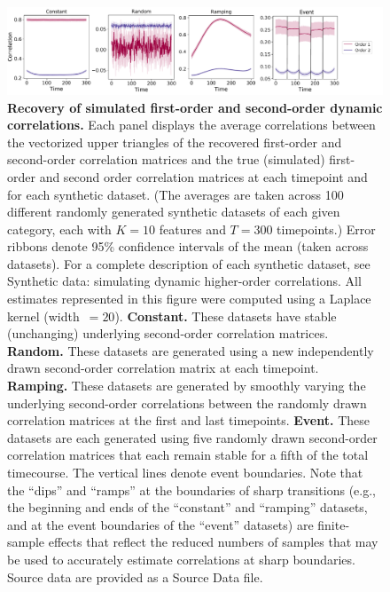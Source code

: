 \documentclass[english]{article}
\begin{document}
\begin{figure}[tp]
  \centering
  \includegraphics[width=\textwidth]{figs/higher_order_sims}
  \caption{\textbf{Recovery of simulated first-order and second-order dynamic correlations.} Each panel displays the average correlations
    between the vectorized upper triangles of the recovered
    first-order and second-order correlation matrices and the true
    (simulated) first-order and second order correlation matrices at each
    timepoint and for each synthetic dataset.  (The averages are taken across 100 different
    randomly generated synthetic datasets of each given category, each
    with $K = 10$ features and $T = 300$ timepoints.)
    Error ribbons denote 95\% confidence intervals of the mean (taken across
    datasets).  For a complete description of each synthetic dataset,
    see Synthetic data: simulating dynamic higher-order
      correlations.  All estimates represented in this figure were
    computed using a Laplace kernel
    (width~$=20$).  \textbf{Constant.} These datasets
    have stable (unchanging) underlying second-order correlation
    matrices. \textbf{Random.} These datasets are
    generated using a new independently drawn second-order correlation
    matrix at each timepoint. \textbf{Ramping.}
    These datasets are generated by smoothly varying the underlying
    second-order correlations between the randomly drawn correlation
    matrices at the first and last timepoints. \textbf{Event.}  These datasets are each generated using five
    randomly drawn second-order correlation matrices that each remain
    stable for a fifth of the total timecourse.  The
    vertical lines denote event boundaries.  Note that the ``dips''
    and ``ramps'' at the boundaries of sharp transitions (e.g., the
    beginning and ends of the ``constant'' and ``ramping'' datasets,
    and at the event boundaries of the ``event'' datasets) are
    finite-sample effects that reflect the reduced numbers of samples
    that may be used to accurately estimate correlations at sharp
    boundaries. Source data are provided as a Source Data file.}
  \label{fig:higher_order_sims}
\end{figure}
\end{document}
